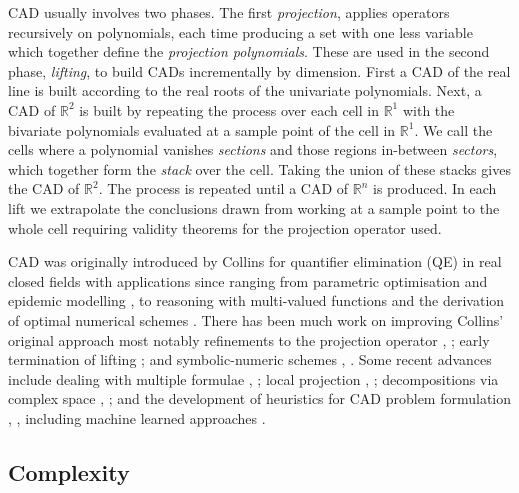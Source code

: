\documentclass{llncs}
\begin{document}
CAD usually involves two phases.  The first {\em projection}, applies operators recursively on  polynomials, each time producing a set with one less variable which together define the {\em projection polynomials}.  These are used in the second phase, {\em lifting}, to build CADs incrementally by dimension.  First a CAD of the real line is built according to the real roots of the univariate polynomials. Next, a CAD of $\mathbb{R}^2$ is built by repeating the process over each cell in $\mathbb{R}^1$ with the bivariate polynomials evaluated at a sample point of the cell in $\mathbb{R}^1$.  We call the cells where a polynomial vanishes {\em sections} and those regions in-between {\em sectors}, which together form the {\em stack} over the cell.  Taking the union of these stacks gives the CAD of $\mathbb{R}^2$.  The process is repeated until a CAD of $\mathbb{R}^n$ is produced.  In each lift we extrapolate the conclusions drawn from working at a sample point to the whole cell requiring validity theorems for the projection operator used.

CAD was originally introduced by Collins for quantifier elimination (QE) in real closed fields \cite{ACM84I} with applications since ranging from parametric optimisation \cite{FPM05} and epidemic modelling \cite{BENW06}, to reasoning with multi-valued functions \cite{DBEW12} and the derivation of optimal numerical schemes \cite{EH14}. 
There has been much work on improving Collins' original approach most notably refinements to the projection operator \cite{McCallum1998} \cite{Brown2001a}, \cite{HDX14}; early termination of lifting \cite{CH91} \cite{WBDE14}; and symbolic-numeric schemes \cite{Strzebonski2006}, \cite{IYAY09}.  Some recent advances include dealing with multiple formulae \cite{BDEMW13}, \cite{BDEMW16}; local projection \cite{Brown2013}, \cite{Strzebonski2014a}; decompositions via complex space \cite{CMXY09}, \cite{BCDEMW14}; and the development of heuristics for CAD problem formulation \cite{BDEW13}, \cite{EBCDMW14}, \cite{WEBD14} including machine learned approaches \cite{HEWDPB14}.



\subsection{Complexity}
\end{document}
